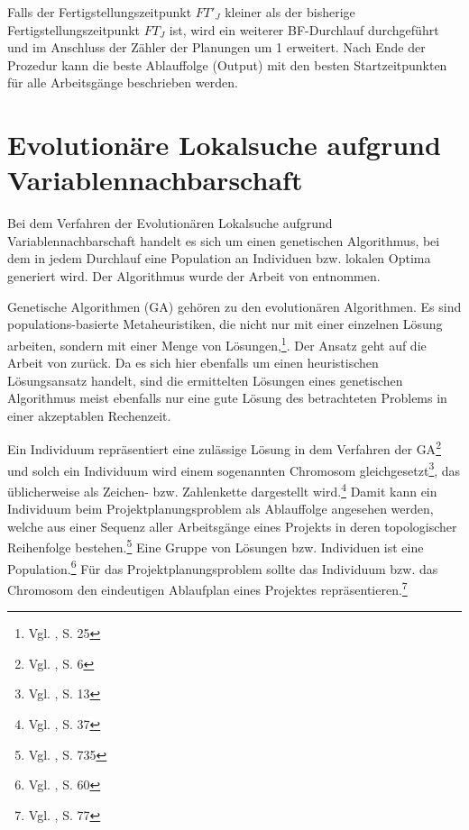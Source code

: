 \documentclass[a4paper,12pt,normalheadings,footexclude,headinclude,liststotoc,nochapterprefix,onecolumn,oneside,parskip,pointlessnumbers]{scrreprt}
\begin{document}
Falls der Fertigstellungszeitpunkt $FT'_{J}$ kleiner als der bisherige Fertigstellungszeitpunkt $FT_{J}$ ist, wird ein weiterer BF-Durchlauf durchgeführt und im Anschluss der Zähler der Planungen um 1 erweitert. Nach Ende der Prozedur kann die beste Ablauffolge (Output) mit den besten Startzeitpunkten für alle Arbeitsgänge beschrieben werden.





\section{Evolutionäre Lokalsuche aufgrund Variablennachbarschaft} \label{kochetov}
Bei dem Verfahren der Evolutionären Lokalsuche aufgrund Variablennachbarschaft handelt es sich um einen genetischen Algorithmus, bei dem in jedem Durchlauf eine Population an Individuen bzw. lokalen Optima generiert wird. Der Algorithmus wurde der Arbeit von \cite{kochetov2003evolutionary} entnommen.





Genetische Algorithmen (GA) gehören zu den evolutionären Algorithmen. %
Es sind populations-basierte Metaheuristiken, die nicht nur mit einer einzelnen Lösung arbeiten, sondern mit einer Menge von Lösungen,\footnote{Vgl. \cite{talbi2009metaheuristics}, S. 25}. Der Ansatz geht auf die Arbeit von \cite{holland1975adaptation} zurück. Da es sich hier ebenfalls um einen heuristischen Lösungsansatz handelt, sind die ermittelten Lösungen eines genetischen Algorithmus meist ebenfalls nur eine gute Lösung des betrachteten Problems in einer akzeptablen Rechenzeit.

Ein Individuum repräsentiert eine zulässige Lösung in dem Verfahren der GA\footnote{Vgl. \cite{mitchell1998introduction}, S. 6} und solch ein Individuum wird einem sogenannten Chromosom gleichgesetzt\footnote{Vgl. \cite{nissen1997einfuhrung}, S. 13}, das üblicherweise als Zeichen- bzw. Zahlenkette dargestellt wird.\footnote{Vgl. \cite{gerdes2004evolutionare}, S. 37} Damit kann ein Individuum beim Projektplanungsproblem als Ablauffolge angesehen werden, welche aus einer Sequenz aller Arbeitsgänge eines Projekts in deren topologischer Reihenfolge bestehen.\footnote{Vgl. \cite{hartmann1998competitive}, S. 735} Eine Gruppe von Lösungen bzw. Individuen ist eine Population.\footnote{Vgl. \cite{koch2014gene}, S. 60} Für das Projektplanungsproblem sollte das Individuum bzw. das Chromosom den eindeutigen Ablaufplan eines Projektes repräsentieren.\footnote{Vgl. \cite{kellenbink2014genetischer}, S. 77} 
\end{document}
